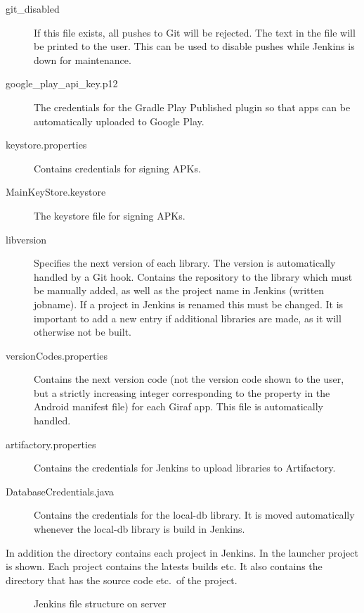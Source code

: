 \begin{description}
  \item[git\_disabled] If this file exists, all pushes to Git will be rejected. The text in the file will be printed to the user. This can be used to disable pushes while Jenkins is down for maintenance.
  \item[google\_play\_api\_key.p12] The credentials for the Gradle Play Published plugin so that apps can be automatically uploaded to Google Play.
  \item[keystore.properties] Contains credentials for signing APKs.
  \item[MainKeyStore.keystore] The keystore file for signing APKs.
  \item[libversion] Specifies the next version of each library. The version is automatically handled by a Git hook. Contains the repository to the library which must be manually added, as well as the project name in Jenkins (written jobname). If a project in Jenkins is renamed this must be changed. It is important to add a new entry if additional libraries are made, as it will otherwise not be built.
  \item[versionCodes.properties] Contains the next version code (not the version code shown to the user, but a strictly increasing integer corresponding to the  property in the Android manifest file) for each Giraf app. This file is automatically handled.
  \item[artifactory.properties] Contains the credentials for Jenkins to upload libraries to Artifactory.
  \item[DatabaseCredentials.java] Contains the credentials for the local-db library. It is moved automatically whenever the local-db library is build in Jenkins.
\end{description}

In addition the  directory contains each project in Jenkins. In  the launcher project is shown. Each project contains the latests builds etc. It also contains the  directory that has the source code etc.\ of the project.

\begin{figure}
\caption{Jenkins file structure on server} \label{fig:jenkins_file_structure}
\end{figure}
